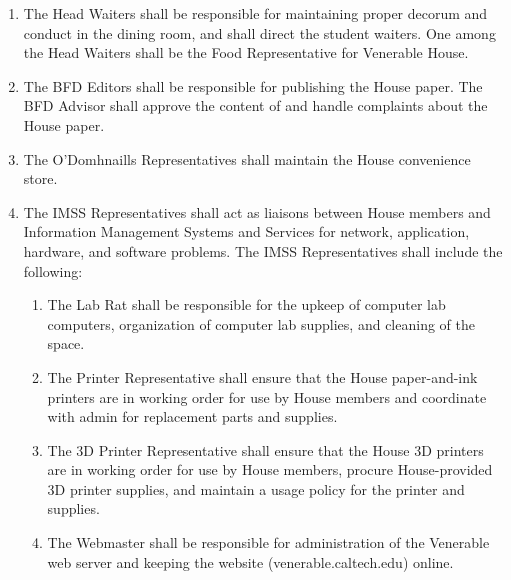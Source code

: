 \documentclass[10pt]{article} %
\begin{document}
\begin{enumerate}
\item The Head Waiters shall be responsible for maintaining proper decorum and conduct in the dining room, and shall direct the student waiters. One among the Head Waiters shall be the Food Representative for Venerable House.
\item The BFD Editors shall be responsible for publishing the House paper. The BFD Advisor shall approve the content of and handle complaints about the House paper.
\item The O'Domhnaills Representatives shall maintain the House convenience store.
\item The IMSS Representatives shall act as liaisons between House members and Information Management Systems and Services for network, application, hardware, and software problems. The IMSS Representatives shall include the following:
\begin{enumerate}
	\item The Lab Rat shall be responsible for the upkeep of computer lab computers, organization of computer lab supplies, and cleaning of the space.
	\item The Printer Representative shall ensure that the House paper-and-ink printers are in working order for use by House members and coordinate with admin for replacement parts and supplies.
	\item The 3D Printer Representative shall ensure that the House 3D printers are in working order for use by House members, procure House-provided 3D printer supplies, and maintain a usage policy for the printer and supplies.
	\item The Webmaster shall be responsible for administration of the Venerable web server and keeping the website (venerable.caltech.edu) online.
\end{enumerate}
\end{enumerate}
\end{document}
